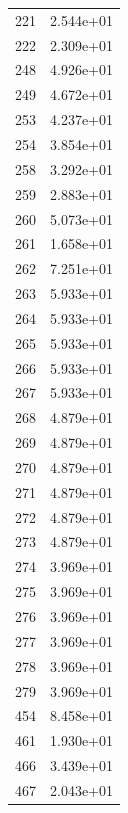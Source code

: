 \documentclass[12pt]{article}
\begin{document}
\begin{longtable}{@{}cc@{}}
221 & 2.544e+01 \\
222 & 2.309e+01 \\
248 & 4.926e+01 \\
249 & 4.672e+01 \\
253 & 4.237e+01 \\
254 & 3.854e+01 \\
258 & 3.292e+01 \\
259 & 2.883e+01 \\
260 & 5.073e+01 \\
261 & 1.658e+01 \\
262 & 7.251e+01 \\
263 & 5.933e+01 \\
264 & 5.933e+01 \\
265 & 5.933e+01 \\
266 & 5.933e+01 \\
267 & 5.933e+01 \\
268 & 4.879e+01 \\
269 & 4.879e+01 \\
270 & 4.879e+01 \\
271 & 4.879e+01 \\
272 & 4.879e+01 \\
273 & 4.879e+01 \\
274 & 3.969e+01 \\
275 & 3.969e+01 \\
276 & 3.969e+01 \\
277 & 3.969e+01 \\
278 & 3.969e+01 \\
279 & 3.969e+01 \\
454 & 8.458e+01 \\
461 & 1.930e+01 \\
466 & 3.439e+01 \\
467 & 2.043e+01 \\

\bottomrule
\end{longtable}
\end{document}
